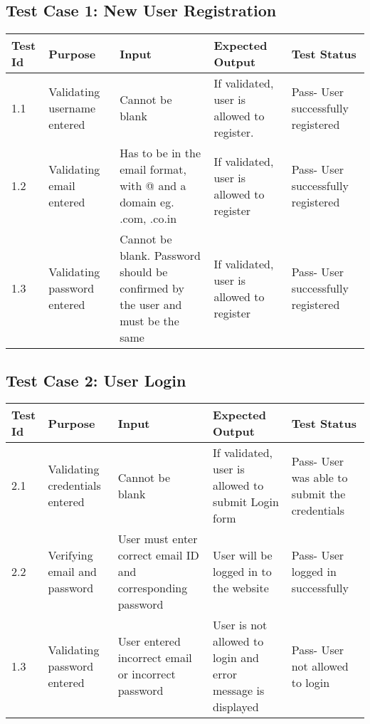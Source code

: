 \documentclass[12pt]{article}
\begin{document}
\subsection {Test Case 1: New User Registration}
\begin{center}
	\begin{longtable}{ | p{2cm} | p{3cm} |  p{3cm} | p{3cm} | p{3cm} | }
		\hline
			\textbf{Test Id} & \textbf{Purpose} & \textbf{Input} & \textbf{Expected Output} & \textbf{Test Status} \\
		\hline
			1.1 & Validating username entered & Cannot be blank & If validated, user is allowed to register. & Pass- User successfully registered\\
		\hline
			1.2 & Validating email entered & Has to be in the email format, with @ and a domain eg. .com, .co.in & If validated, user is allowed to register & Pass- User successfully registered\\
		\hline
			1.3 & Validating password entered & Cannot be blank. Password should be confirmed by the user and must be the same & If validated, user is allowed to register & Pass- User successfully registered\\
		\hline
	\end{longtable}
\end{center}

\subsection {Test Case 2: User Login}
\begin{center}
	\begin{longtable}{ | p{2cm} | p{3cm} |  p{3cm} | p{3cm} | p{3cm} | }
		\hline
			\textbf{Test Id} & \textbf{Purpose} & \textbf{Input} & \textbf{Expected Output} & \textbf{Test Status} \\
		\hline
			2.1 & Validating credentials entered & Cannot be blank & If validated, user is allowed to submit Login form & Pass- User was able to submit the credentials\\
		\hline
			2.2 & Verifying email and password & User must enter correct email ID and corresponding password & User will be logged in to the website & Pass- User logged in successfully\\
		\hline
			1.3 & Validating password entered & User entered incorrect email or incorrect password & User is not allowed to login and error message is displayed & Pass- User not allowed to login\\
		\hline
	\end{longtable}
\end{center}
\end{document}
